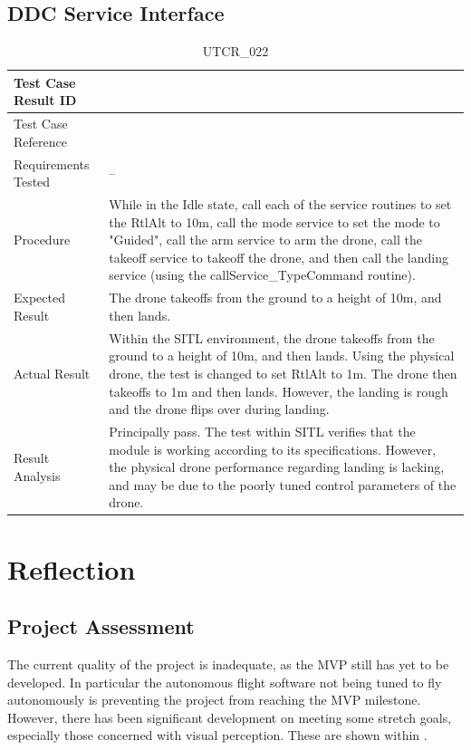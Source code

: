 \documentclass[12pt, titlepage]{article}
\begin{document}
\clearpage

\subsection{DDC Service Interface}
\label{ddcServiceInterface}

\begin{table}[!h]
\begin{center}
\caption {UTCR\_022}
\label{tab:UTCR_022}
\begin{tabular}{ | m{3.2cm} | m{12.2cm} | } 
\hline
Test Case Result ID & \nameref{tab:UTCR_022} \\ 
\hline
Test Case Reference & \nameref{tab:UTC_022}  \\ 
\hline
Requirements Tested & -- \\ 
\hline
Procedure & While in the Idle state, call each of the service routines to set the RtlAlt to 10m, call the mode service to set the mode to "Guided", call the arm service to arm the drone, call the takeoff service to takeoff the drone, and then call the landing service (using the callService_TypeCommand routine). \\ 
\hline
Expected Result & The drone takeoffs from the ground to a height of 10m, and then lands. \\
\hline
Actual Result & Within the SITL environment, the drone takeoffs from the ground to a height of 10m, and then lands. Using the physical drone, the test is changed to set RtlAlt to 1m. The drone then takeoffs to 1m and then lands. However, the landing is rough and the drone flips over during landing. \\
\hline
Result Analysis & Principally pass. The test within SITL verifies that the module is working according to its specifications. However, the physical drone performance regarding landing is lacking, and may be due to the poorly tuned control parameters of the drone. \\ 
\hline
\end{tabular}
\end{center}
\end{table}

\clearpage

\section{Reflection}
\subsection{Project Assessment}
The current quality of the project is inadequate, as the MVP still has yet to be developed. In particular the autonomous flight software not being tuned to fly autonomously is preventing the project from reaching the MVP milestone. However, there has been significant development on meeting some stretch goals, especially those concerned with visual perception. These are shown within . 
\end{document}
